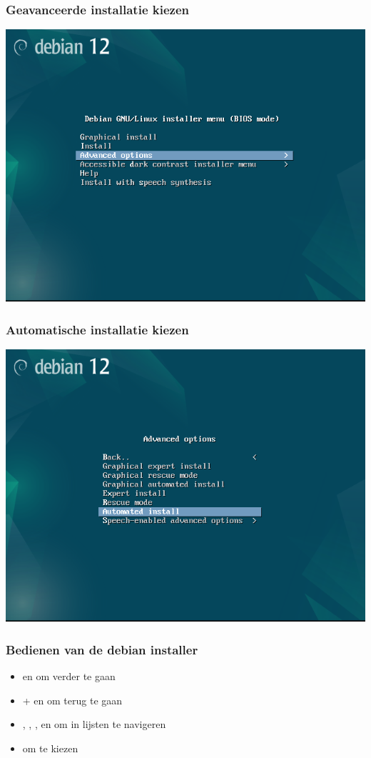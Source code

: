 \documentclass{beamer}
\begin{document}
\begin{frame}
  \frametitle{Geavanceerde installatie kiezen}

  \centering
  \includegraphics[width=\textwidth]{img/advanced-options.png}
\end{frame}

\begin{frame}
  \frametitle{Automatische installatie kiezen}

  \centering
  \includegraphics[width=\textwidth]{img/automated-install.png}
\end{frame}

\begin{frame}
   \frametitle{Bedienen van de debian installer}
   \begin{itemize}
      \item \Tab{} en \RArrow{} om verder te gaan
      \item \Shift{}+\Tab{} en \LArrow{} om terug te gaan
      \item \UArrow{}, \DArrow{}, \PgUp{}, en \PgDown om in lijsten te navigeren
      \item \Enter om te kiezen
   \end{itemize}
\end{frame}
\end{document}
